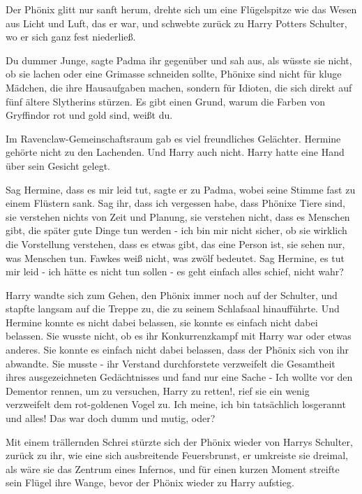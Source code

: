 Der Phönix glitt nur sanft herum, drehte sich um eine Flügelspitze wie das Wesen
aus Licht und Luft, das er war, und schwebte zurück zu Harry Potters Schulter,
wo er sich ganz fest niederließ.

\glqq Du dummer Junge\grqq{}, sagte Padma ihr gegenüber und sah aus, als wüsste
sie nicht, ob sie lachen oder eine Grimasse schneiden sollte, \glqq Phönixe sind
nicht für kluge Mädchen, die ihre Hausaufgaben machen, sondern für Idioten, die
sich direkt auf fünf ältere Slytherins stürzen. Es gibt einen Grund, warum die
Farben von Gryffindor rot und gold sind, weißt du.\grqq{}

Im Ravenclaw-Gemeinschaftsraum gab es viel freundliches Gelächter. Hermine
gehörte nicht zu den Lachenden. Und Harry auch nicht. Harry hatte eine Hand über
sein Gesicht gelegt.

\glqq Sag Hermine, dass es mir leid tut\grqq{}, sagte er zu Padma, wobei seine
Stimme fast zu einem Flüstern sank. \glqq Sag ihr, dass ich vergessen habe, dass
Phönixe Tiere sind, sie verstehen nichts von Zeit und Planung, sie verstehen
nicht, dass es Menschen gibt, die später gute Dinge tun werden - ich bin mir
nicht sicher, ob sie wirklich die Vorstellung verstehen, dass es etwas gibt, das
eine Person ist, sie sehen nur, was Menschen tun. Fawkes weiß nicht, was zwölf
bedeutet. Sag Hermine, es tut mir leid - ich hätte es nicht tun sollen - es geht
einfach alles schief, nicht wahr?\grqq{}

Harry wandte sich zum Gehen, den Phönix immer noch auf der Schulter, und stapfte
langsam auf die Treppe zu, die zu seinem Schlafsaal hinaufführte. Und Hermine
konnte es nicht dabei belassen, sie konnte es einfach nicht dabei belassen. Sie
wusste nicht, ob es ihr Konkurrenzkampf mit Harry war oder etwas anderes. Sie
konnte es einfach nicht dabei belassen, dass der Phönix sich von ihr abwandte.
Sie musste - ihr Verstand durchforstete verzweifelt die Gesamtheit ihres
ausgezeichneten Gedächtnisses und fand nur eine Sache - \glqq Ich wollte vor den
Dementor rennen, um zu versuchen, Harry zu retten!\grqq{}, rief sie ein wenig
verzweifelt dem rot-goldenen Vogel zu. \glqq Ich meine, ich bin tatsächlich
losgerannt und alles! Das war doch dumm und mutig, oder?\grqq{}

Mit einem trällernden Schrei stürzte sich der Phönix wieder von Harrys Schulter,
zurück zu ihr, wie eine sich ausbreitende Feuersbrunst, er umkreiste sie
dreimal, als wäre sie das Zentrum eines Infernos, und für einen kurzen Moment
streifte sein Flügel ihre Wange, bevor der Phönix wieder zu Harry aufstieg.

